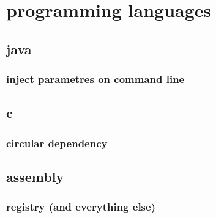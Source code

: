 \chapter{programming languages}
\section{java}
\subsection{inject parametres on command line}
\section{c}
\subsection{circular dependency}
\section{assembly}
\subsection{registry (and everything else)}
